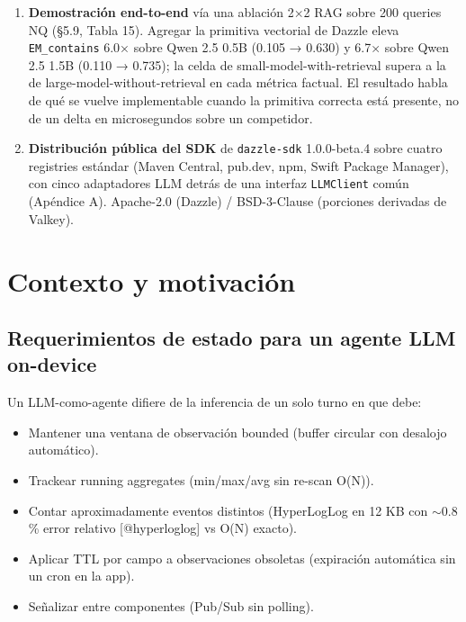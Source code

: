 \begin{enumerate}
  del agente (§5.6).
\item
  \textbf{Demostración end-to-end} vía una ablación 2×2 RAG sobre 200 queries NQ
  (§5.9, Tabla 15). Agregar la primitiva vectorial de Dazzle eleva
  \texttt{EM\_contains} 6.0× sobre Qwen 2.5 0.5B (0.105 → 0.630) y 6.7× sobre
  Qwen 2.5 1.5B (0.110 → 0.735); la celda de small-model-with-retrieval supera a
  la de large-model-without-retrieval en cada métrica factual. El resultado
  habla de qué se vuelve implementable cuando la primitiva correcta está
  presente, no de un delta en microsegundos sobre un competidor.
\item
  \textbf{Distribución pública del SDK} de \texttt{dazzle-sdk} 1.0.0-beta.4
  sobre cuatro registries estándar (Maven Central, pub.dev, npm, Swift Package
  Manager), con cinco adaptadores LLM detrás de una interfaz \texttt{LLMClient}
  común (Apéndice A). Apache-2.0 (Dazzle) / BSD-3-Clause (porciones derivadas de
  Valkey).
\end{enumerate}

\section{Contexto y motivación}\label{contexto-y-motivaciuxf3n}

\subsection{Requerimientos de estado para un agente LLM
on-device}\label{requerimientos-de-estado-para-un-agente-llm-on-device}

Un LLM-como-agente difiere de la inferencia de un solo turno en que debe:

\begin{itemize}
\tightlist
\item
  Mantener una ventana de observación bounded (buffer circular con desalojo
  automático).
\item
  Trackear running aggregates (min/max/avg sin re-scan O(N)).
\item
  Contar aproximadamente eventos distintos (HyperLogLog en 12 KB con
  \(\sim 0.8\) \% error relativo {[}@hyperloglog{]} vs O(N) exacto).
\item
  Aplicar TTL por campo a observaciones obsoletas (expiración automática sin un
  cron en la app).
\item
  Señalizar entre componentes (Pub/Sub sin polling).
\end{itemize}

